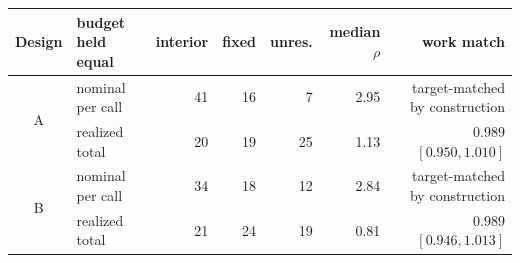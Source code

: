 \begin{tabular}{@{}c l r r r r r@{}}
\toprule
Design & budget held equal & interior & fixed & unres. & median $\rho$ & work match \\
\midrule
\multirow{2}{*}{A} & nominal per call & 41 & 16 & 7 & 2.95 & target-matched by construction \\
 & realized total & 20 & 19 & 25 & 1.13 & $0.989$ $[0.950,1.010]$ \\
\midrule
\multirow{2}{*}{B} & nominal per call & 34 & 18 & 12 & 2.84 & target-matched by construction \\
 & realized total & 21 & 24 & 19 & 0.81 & $0.989$ $[0.946,1.013]$ \\
\bottomrule
\end{tabular}
